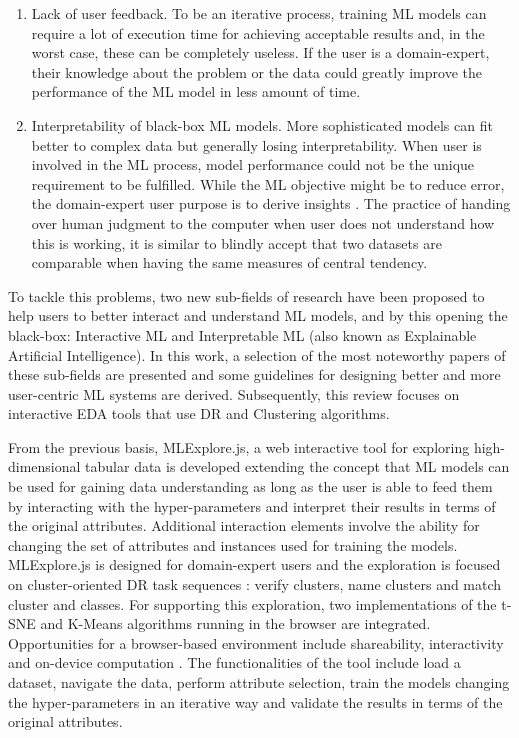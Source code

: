 \begin{enumerate}
\item Lack of user feedback. To be an iterative process, training ML models can require a lot of execution time for achieving acceptable results and, in the worst case, these can be completely useless. If the user is a domain-expert, their knowledge about the problem or the data could greatly improve the performance of the ML model in less amount of time.
\item Interpretability of black-box ML models. More sophisticated models can fit better to complex data but generally losing interpretability. When user is involved in the ML process, model performance could not be the unique requirement to be fulfilled. While the ML objective might be to reduce error, the domain-expert user purpose is to derive insights \cite{Lipton2017}. The practice of handing over human judgment to the computer when user does not understand how this is working, it is similar to blindly accept that two datasets are comparable when having the same measures of central tendency.
\end{enumerate}

To tackle this problems, two new sub-fields of research have been proposed to help users to better interact and understand ML models, and by this opening the black-box: Interactive ML and Interpretable ML (also known as Explainable Artificial Intelligence). In this work, a selection of the most noteworthy papers of these sub-fields are presented and some guidelines for designing better and more user-centric ML systems are derived. Subsequently, this review focuses on interactive EDA tools that use DR and Clustering algorithms.

From the previous basis, MLExplore.js, a web interactive tool for exploring high-dimensional tabular data is developed extending the concept that ML models can be used for gaining data understanding as long as the user is able to feed them by interacting with the hyper-parameters and interpret their results in terms of the original attributes. Additional interaction elements involve the ability for changing the set of attributes and instances used for training the models. MLExplore.js is designed for domain-expert users and the exploration is focused on cluster-oriented DR task sequences \cite{Brehmer2014VisualizingSequences}: verify clusters, name clusters and match cluster and classes. For supporting this exploration, two implementations of the t-SNE \cite{VanDerMaaten2008} and K-Means \cite{Lloyd1982LeastPCM} algorithms running in the browser are integrated. Opportunities for a browser-based environment include shareability, interactivity and on-device computation \cite{Smilkov2019TensorFlow.js:Beyond}. The functionalities of the tool include load a dataset, navigate the data, perform attribute selection, train the models changing the hyper-parameters in an iterative way and validate the results in terms of the original attributes.

